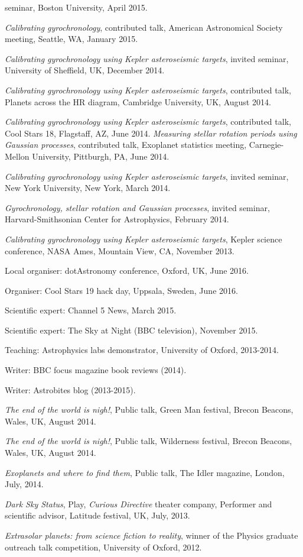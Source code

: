 \documentclass[12pt,letterpaper]{article}
\begin{document}
\begin{list}{}{\cvlist}
seminar, Boston University, April 2015.
\item
{\it Calibrating gyrochronology}, contributed talk, American Astronomical
Society meeting, Seattle, WA, January 2015.
\item
{\it Calibrating gyrochronology using Kepler asteroseismic targets}, invited
seminar, University of Sheffield, UK, December 2014.
\item
{\it Calibrating gyrochronology using Kepler asteroseismic targets},
contributed talk, Planets across the HR diagram, Cambridge University, UK,
August 2014.
\item
{\it Calibrating gyrochronology using Kepler asteroseismic targets},
contributed talk, Cool Stars 18, Flagstaff, AZ, June 2014.
{\it Measuring stellar rotation periods using Gaussian processes},
contributed talk, Exoplanet statistics meeting, Carnegie-Mellon University,
Pittburgh, PA, June 2014.
\item
{\it Calibrating gyrochronology using Kepler asteroseismic targets}, invited
seminar, New York University, New York, March 2014.
\item
{\it Gyrochronology, stellar rotation and Gaussian processes}, invited
seminar, Harvard-Smithsonian Center for Astrophysics, February 2014.
\item
{\it Calibrating gyrochronology using Kepler asteroseismic targets}, Kepler
science conference, NASA Ames, Mountain View, CA, November 2013.
\end{list}

\begin{list}{}{\cvlist}
\item
Local organiser: dotAstronomy conference, Oxford, UK, June 2016.
\item
Organiser: Cool Stars 19 hack day, Uppsala, Sweden, June 2016.
\item
Scientific expert: Channel 5 News, March 2015.
\item
Scientific expert: The Sky at Night (BBC television), November 2015.
\item
Teaching: Astrophysics labs demonstrator, University of Oxford, 2013-2014.
\item
Writer: BBC focus magazine book reviews (2014).
\item
Writer: Astrobites blog (2013-2015).
\item
{\it The end of the world is nigh!}, Public talk, Green Man festival, Brecon
Beacons, Wales, UK, August 2014.
\item
{\it The end of the world is nigh!}, Public talk, Wilderness festival, Brecon
Beacons, Wales, UK, August 2014.
\item
{\it Exoplanets and where to find them}, Public talk, The Idler magazine,
London, July, 2014.
\item
{\it Dark Sky Status}, Play, {\it Curious Directive} theater company,
Performer and scientific advisor, Latitude festival, UK, July, 2013.
\item
{\it Extrasolar planets: from science fiction to reality}, winner of the
Physics graduate outreach talk competition, University of Oxford, 2012.
\end{list}

\ifdefined\withpubs
    \begin{list}{}{\cvlist}
    
    \end{list}
\fi
\end{document}
